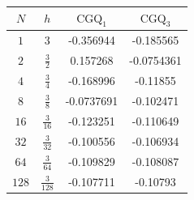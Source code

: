 \documentclass[a4paper,12pt,onecolumn,final]{article}
\begin{document}
\begin{tabular}{cc|cc}
 $N$ & $h$ & $\mathrm{CGQ}_1$ & $\mathrm{CGQ}_3$
\\
\hline
 $1$ & $3$ & -0.356944 & -0.185565
\\
 $2$ & $\tfrac{3}{2}$ & 0.157268 & -0.0754361
\\
 $4$ & $\tfrac{3}{4}$ & -0.168996 & -0.11855
\\
 $8$ & $\tfrac{3}{8}$ & -0.0737691 & -0.102471
\\
 $16$ & $\tfrac{3}{16}$ & -0.123251 & -0.110649
\\
 $32$ & $\tfrac{3}{32}$ & -0.100556 & -0.106934
\\
 $64$ & $\tfrac{3}{64}$ & -0.109829 & -0.108087
\\
 $128$ & $\tfrac{3}{128}$ & -0.107711 & -0.10793
\\

\end{tabular}
\end{document}
